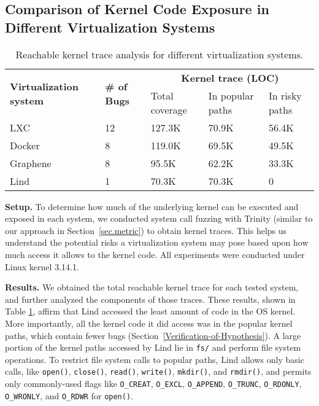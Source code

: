{{{\subsection{Comparison of Kernel Code Exposure in Different Virtualization
Systems}
\label{Reachable-Kernel-Trace-Analysis-for-Different-Virtualization-Systems}
\begin{table}
\centering
\scriptsize
\begin{tabular}{|l|l|l|l|l|}
  \hline
  \multirow{3}{1.5cm}{\bf Virtualization system} & \multirow{3}{0.5cm}{\bf \# of Bugs} & \multicolumn{3}{c|}{\bf Kernel trace (LOC)} \\ \cline{3-5}
  & & \multirow{2}{1.2cm}{Total coverage} & \multirow{2}{1.2cm}{In popular paths} & \multirow{2}{1.2cm}{In risky paths}  \\
  & & & & \\  \hline
  LXC & 12 & 127.3K & 70.9K & 56.4K \\
  \hline
  Docker & 8 & 119.0K & 69.5K & 49.5K \\
  \hline
  Graphene & 8 & 95.5K & 62.2K & 33.3K \\
  \hline
  Lind & 1 & 70.3K & 70.3K & 0 \\
  \hline
\end{tabular}
\caption{\small Reachable kernel trace analysis for different virtualization
systems.}
\label{table:trace-systems}
\end{table}


\noindent
\textbf{Setup.}
To determine how much of the underlying kernel can be executed and exposed in
each system,
we conducted system call fuzzing with Trinity (similar to our approach in
Section~{\ref{sec.metric}}) to obtain
kernel traces. This helps us understand the potential risks a virtualization system
may pose based upon how much access it allows to the kernel code.
All experiments were conducted under Linux kernel 3.14.1.

\noindent
\textbf{Results.}
We obtained the total reachable kernel trace for
each tested system,
and further analyzed the components of those traces. These results,
shown in Table \ref{table:trace-systems}, affirm that Lind accessed the
least amount of code in the OS
kernel. More importantly, all the kernel code it did access was in the
popular kernel paths, which contain fewer bugs (Section~{\ref{Verification-of-Hypothesis}}).
A large portion of the kernel paths accessed by Lind lie in
\texttt{fs/} and perform file system operations.
To restrict file system calls to popular paths, Lind allows only basic calls,
like \texttt{open()}, \texttt{close()}, \texttt{read()}, \texttt{write()}, \texttt{mkdir()},
and \texttt{rmdir()}, and permits only commonly-used flags like \texttt{O\_CREAT}, \texttt{O\_EXCL},
 \texttt{O\_APPEND}, \texttt{O\_TRUNC},
\texttt{O\_RDONLY}, \texttt{O\_WRONLY}, and \texttt{O\_RDWR}
for \texttt{open()}.

}}}
